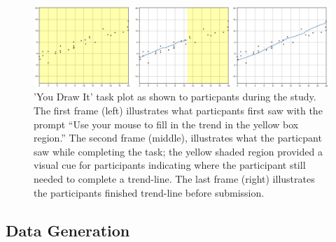 \documentclass[12pt]{article}
\begin{document}
\begin{figure}[tbp]

{\centering \includegraphics[width=1\linewidth,]{images/ydi-stimuli} 

}

\caption{'You Draw It' task plot as shown to particpants during the study. The first frame (left) illustrates what particpants first saw with the prompt “Use your mouse to fill in the trend in the yellow box region.” The second frame (middle), illustrates what the particpant saw while completing the task; the yellow shaded region provided a visual cue for participants indicating where the participant still needed to complete a trend-line. The last frame (right) illustrates the participants finished trend-line before submission.}\label{fig:ydi-stimuli}
\end{figure}

\hypertarget{data-generation}{%
\subsection{Data Generation}\label{data-generation}}
\end{document}
